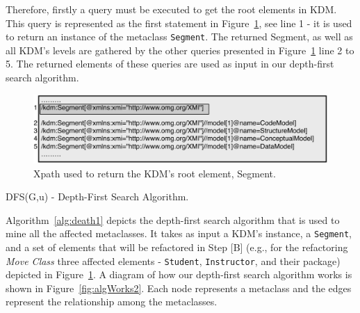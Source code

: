 Therefore, firstly a query must be executed to get the root elements in KDM. This query is represented as the first statement in Figure~\ref{fig:queriesXPath}, see line 1 - it is used to return an instance of the metaclass \texttt{Segment}. The returned Segment, as well as all KDM's levels are gathered by the other queries presented in Figure~\ref{fig:queriesXPath} line 2 to 5. The returned elements of these queries are used as input in our depth-first search algorithm.

\begin{figure}[h]
	\centering
	\includegraphics[scale=0.455]{figuras/queries}
	\caption{Xpath used to return the KDM's root element, Segment.}
	\label{fig:queriesXPath}
\end{figure}


\begin{algorithm}[h]
     \SetAlgoLined
     \caption{DFS(G,u) - Depth-First Search Algorithm.}
     \label{alg:death1}
   \end{algorithm}

Algorithm~\ref{alg:death1} depicts the depth-first search algorithm that is used to mine all the affected metaclasses. It takes as input a KDM's instance, a \texttt{Segment}, and a set of elements that will be refactored in Step [B] (e.g., for the refactoring \textit{Move Class} three affected elements - \texttt{Student}, \texttt{Instructor}, and their package) depicted in Figure~\ref{fig:queriesXPath}. A diagram of how our depth-first search algorithm works is shown in Figure~\ref{fig:algWorks2}. Each node represents a metaclass and the edges represent the relationship among the metaclasses.

